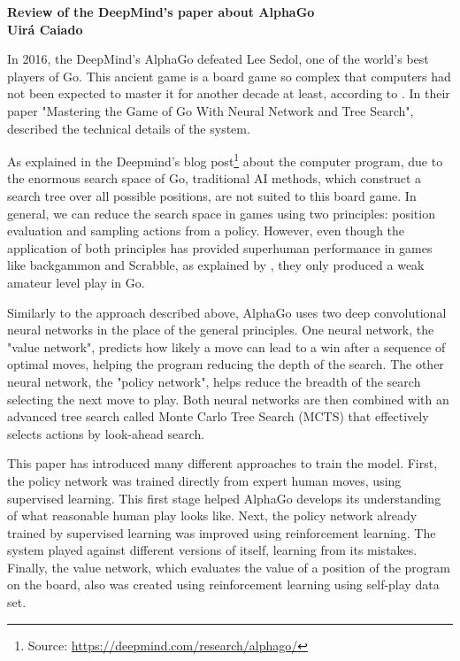 \documentclass[a4paper]{article}
\begin{document}

\begin{center}

{\bf \large Review of the DeepMind's paper about AlphaGo \\ \small Uirá Caiado}
\end{center}




In 2016, the DeepMind's AlphaGo defeated Lee Sedol, one of the world’s best players of Go. This ancient game is a board game so complex that computers had not been expected to master it for another decade at least, according to \cite{Economist2017a}. In their paper "Mastering the Game of Go With Neural Network and Tree Search", \cite{Silver:2016hl} described the technical details of the system.

As explained in the Deepmind's blog post\footnote{Source: \url{https://deepmind.com/research/alphago/}} about the computer program, due to the enormous search space of Go, traditional AI methods, which construct a search tree over all possible positions, are not suited to this board game. In general, we can reduce the search space in games using two principles: position evaluation and sampling actions from a policy. However, even though the application of both principles has provided superhuman performance in games like backgammon and Scrabble, as explained by \cite{Silver:2016hl}, they only produced a weak amateur level play in Go.

Similarly to the approach described above, AlphaGo uses two deep convolutional neural networks in the place of the general principles. One neural network, the "value network", predicts how likely a move can lead to a win after a sequence of optimal moves, helping the program reducing the depth of the search. The other neural network, the "policy network", helps reduce the breadth of the search selecting the next move to play. Both neural networks are then combined with an advanced tree search called Monte Carlo Tree Search (MCTS) that effectively selects actions by look-ahead search.

This paper has introduced many different approaches to train the model. First, the policy network was trained directly from expert human moves, using supervised learning. This first stage helped AlphaGo develops its understanding of what reasonable human play looks like. Next, the policy network already trained by supervised learning was improved using reinforcement learning. The system played against different versions of itself, learning from its mistakes. Finally, the value network, which evaluates the value of a position of the program on the board, also was created using reinforcement learning using self-play data set.
\end{document}
